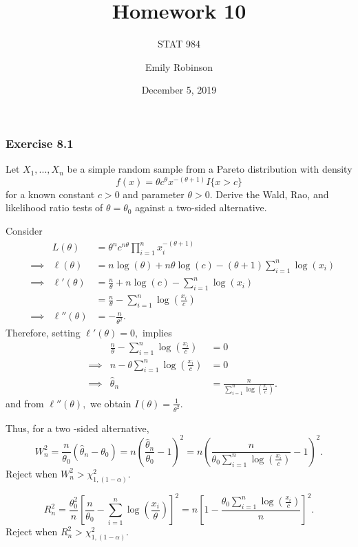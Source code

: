 \documentclass[12pt,]{article}
\title{Homework 10}
\subtitle{STAT 984}
\author{Emily Robinson}
\date{December 5, 2019}
\begin{document}
\maketitle

\hypertarget{exercise-8.1}{%
\subsubsection{Exercise 8.1}\label{exercise-8.1}}

Let \(X_1,...,X_n\) be a simple random sample from a Pareto distribution
with density \[f(x)=\theta c^\theta x^{-(\theta+1)}I\{x>c\}\] for a
known constant \(c>0\) and parameter \(\theta>0.\) Derive the Wald, Rao,
and likelihood ratio tests of \(\theta=\theta_0\) against a two-sided
alternative.

Consider \begin{align*}
&& L(\theta)&=\theta^nc^{n\theta}\prod_{i=1}^nx_i^{-(\theta+1)}\\
&\implies& \ell (\theta) & = n\log(\theta)+n\theta\log(c)-(\theta+1)\sum_{i=1}^n\log(x_i)\\
&\implies& \ell ' (\theta) & = \frac{n}{\theta}+n\log(c)-\sum_{i=1}^n\log(x_i)\\
&&&=\frac{n}{\theta}-\sum_{i=1}^n\log\left(\frac{x_i}{c}\right)\\
&\implies&\ell '' (\theta) & = -\frac{n}{\theta^2}.
\end{align*} Therefore, setting \(\ell ' (\theta) = 0,\) implies
\begin{align*}
&&\frac{n}{\theta}-\sum_{i=1}^n\log\left(\frac{x_i}{c}\right) & = 0\\
&\implies& n-\theta\sum_{i=1}^n\log\left(\frac{x_i}{c}\right) & = 0\\
&\implies& \hat\theta_n & = \frac{n}{\sum_{i=1}^n\log\left(\frac{x_i}{c}\right)}.
\end{align*} and from \(\ell '' (\theta),\) we obtain
\(I(\theta)=\frac{1}{\theta^2}.\)

Thus, for a two -sided alternative,
\[W_n^2 = \frac{n}{\theta_0}(\hat\theta_n-\theta_0) =n\left(\frac{\hat\theta_n}{\theta_0}-1\right)^2=n\left(\frac{n}{\theta_0\sum_{i=1}^n\log(\frac{x_i}{c})}-1\right)^2.\]
Reject when \(W_n^2 > \chi^2_{1,(1-\alpha)}.\)

\[R_n^2=\frac{\theta_0^2}{n}\left[\frac{n}{\theta_0}-\sum_{i=1}^n\log\left(\frac{x_i}{\theta}\right)\right]^2=n\left[1-\frac{\theta_0\sum_{i=1}^n\log\left(\frac{x_i}{c}\right)}{n}\right]^2.\]
Reject when \(R_n^2 > \chi^2_{1,(1-\alpha)}.\)
\end{document}
